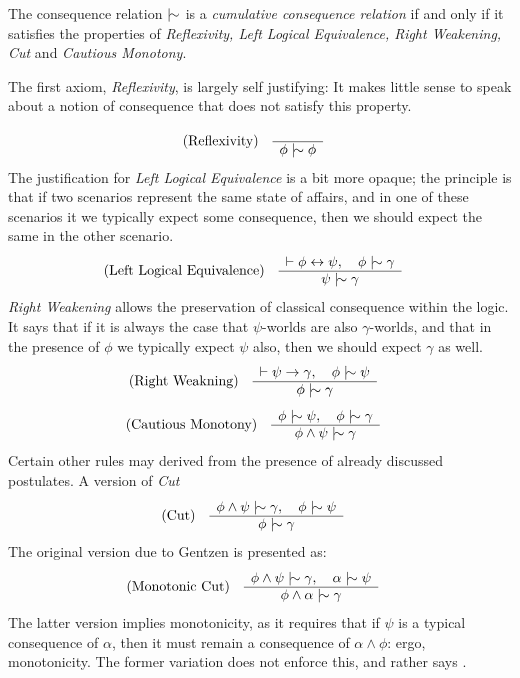 \begin{definition}
\label{definition:cumulative-consequence-relation}
The consequence relation $\twiddle$ is a \emph{cumulative consequence relation} if and only if it satisfies the properties of \emph{Reflexivity, Left Logical Equivalence, Right Weakening, Cut} and \emph{Cautious Monotony}.
\end{definition}
%
The first axiom, \textit{Reflexivity}, is largely self justifying: It makes little sense to speak about a notion of consequence that does not satisfy this property.
\begin{align}
\label{postulate:ref}
\inferLeft{Reflexivity}{}{\phi \twiddle \phi}
\end{align}
The justification for \textit{Left Logical Equivalence} is a bit more opaque; the principle is that if two scenarios represent the same state of affairs, and in one of these scenarios it we typically expect some consequence, then we should expect the same in the other scenario.
%
\begin{align}
\label{postulate:lle}
\inferLeft{Left Logical Equivalence}{\vdash \phi \leftrightarrow \psi, \quad \phi \twiddle \gamma}{\psi \twiddle \gamma}
\end{align}
%
\textit{Right Weakening} allows the preservation of classical consequence within the logic. It says that if it is always the case that $\psi$-worlds are also $\gamma$-worlds, and that in the presence of $\phi$ we typically expect $\psi$ also, then we should expect $\gamma$ as well.
%
\begin{align}
\label{postulate:rw}
\inferLeft{Right Weakning}{\vdash \psi \rightarrow \gamma, \quad  \phi \twiddle \psi}{\phi \twiddle \gamma}
\end{align}
%
\begin{align}
\label{postulate:cm}
\inferLeft{Cautious Monotony}{\phi \twiddle \psi, \quad \phi \twiddle \gamma }{\phi \land \psi \twiddle \gamma}
\end{align}
%
Certain other rules may derived from the presence of already discussed postulates. A version of \textit{Cut}
%
\begin{align}
\label{postulate:cut}
\inferLeft{Cut}{\phi \land \psi \twiddle \gamma, \quad \phi \twiddle \psi}{\phi \twiddle \gamma}
\end{align}
%
The original version due to Gentzen \cite{Ben1993Mathematical} is presented as:
%
\begin{align}
\inferLeft{Monotonic Cut}{\phi \land \psi \twiddle \gamma, \quad \alpha \twiddle \psi}{\phi \land \alpha \twiddle \gamma}
\end{align}
%
The latter version implies monotonicity, as it requires that if $\psi$ is a typical consequence of $\alpha$, then it must remain a consequence of $\alpha \land \phi$: ergo, monotonicity. The former variation does not enforce this, and rather says .

